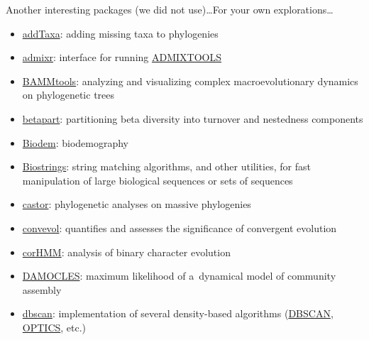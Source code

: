 \documentclass[compress, xelatex, 11pt, xcolor=svgnames, aspectratio=169, url={hyphens, lowtilde}]{beamer}
\begin{document}
\begin{frame}[allowframebreaks]{Another interesting packages (we did not use)\ldots}{For your own explorations\ldots}
	\begin{itemize}
		\item \href{https://github.com/eliotmiller/addTaxa}{addTaxa}: adding missing taxa to phylogenies
		\item \href{https://CRAN.R-project.org/package=admixr}{admixr}: interface for running \href{https://doi.org/10.1534/genetics.112.145037}{ADMIXTOOLS}
		\item \href{https://CRAN.R-project.org/package=BAMMtools}{BAMMtools}: analyzing and visualizing complex macroevolutionary dynamics on phylogenetic trees
		\item \href{https://CRAN.R-project.org/package=betapart}{betapart}: partitioning beta diversity into turnover and nestedness components
		\item \href{https://CRAN.R-project.org/package=Biodem}{Biodem}: biodemography
		\item \href{https://www.bioconductor.org/packages/release/bioc/html/Biostrings.html}{Biostrings}: string matching algorithms, and other utilities, for fast manipulation of large biological sequences or sets of sequences
		\item \href{https://CRAN.R-project.org/package=castor}{castor}: phylogenetic analyses on massive phylogenies
		\item \href{https://CRAN.R-project.org/package=convevol}{convevol}: quantifies and assesses the significance of convergent evolution
		\item \href{https://CRAN.R-project.org/package=corHMM}{corHMM}: analysis of binary character evolution
		\item \href{https://CRAN.R-project.org/package=DAMOCLES}{DAMOCLES}: maximum likelihood of a~dynamical model of community assembly
		\item \href{https://CRAN.R-project.org/package=dbscan}{dbscan}: implementation of several density-based algorithms (\href{https://en.wikipedia.org/wiki/DBSCAN}{DBSCAN}, \href{https://en.wikipedia.org/wiki/OPTICS_algorithm}{OPTICS}, etc.)

\end{itemize}
\end{frame}
\end{document}
